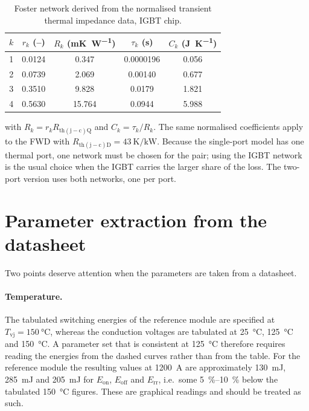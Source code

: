 \documentclass[11pt,a4paper]{article}
\begin{document}
\begin{table}[h]
\centering
\caption{Foster network derived from the normalised transient thermal impedance
data, IGBT chip.}
\begin{tabular}{cS[table-format=1.3]S[table-format=2.3]S[table-format=1.3]S[table-format=1.3]}
\toprule
$k$ & {$r_k$ (--)} & {$R_k$ (\si{\milli\kelvin\per\watt})} &
{$\tau_k$ (\si{\second})} & {$C_k$ (\si{\joule\per\kelvin})} \\
 & 0.0124 & 0.347  & 0.0000196 & 0.056 \\
2 & 0.0739 & 2.069  & 0.00140   & 0.677 \\
3 & 0.3510 & 9.828  & 0.0179    & 1.821 \\
4 & 0.5630 & 15.764 & 0.0944    & 5.988 \\
\bottomrule
\end{tabular}
\end{table}

\noindent
with $R_k = r_k R_\mathrm{th(j-c)Q}$ and $C_k = \tau_k/R_k$. The same
normalised coefficients apply to the FWD with
$R_\mathrm{th(j-c)D} = \SI{43}{\kelvin\per\kilo\watt}$. Because the single-port
model has one thermal port, one network must be chosen for the pair; using the
IGBT network is the usual choice when the IGBT carries the larger share of the
loss. The two-port version uses both networks, one per port.

\section{Parameter extraction from the datasheet}
\label{sec:param}

Two points deserve attention when the parameters are taken from a datasheet.

\paragraph{Temperature.} The tabulated switching energies of the reference
module are specified at $T_\mathrm{vj} = \SI{150}{\degreeCelsius}$, whereas the
conduction voltages are tabulated at \SI{25}{\degreeCelsius},
\SI{125}{\degreeCelsius} and \SI{150}{\degreeCelsius}. A parameter set that is
consistent at \SI{125}{\degreeCelsius} therefore requires reading the energies
from the dashed curves rather than from the table. For the reference module the
resulting values at \SI{1200}{\ampere} are approximately
\SI{130}{\milli\joule}, \SI{285}{\milli\joule} and \SI{205}{\milli\joule} for
$E_\mathrm{on}$, $E_\mathrm{off}$ and $E_\mathrm{rr}$, i.e.\ some
\SIrange{5}{10}{\percent} below the tabulated \SI{150}{\degreeCelsius} figures.
These are graphical readings and should be treated as such.
\end{document}

